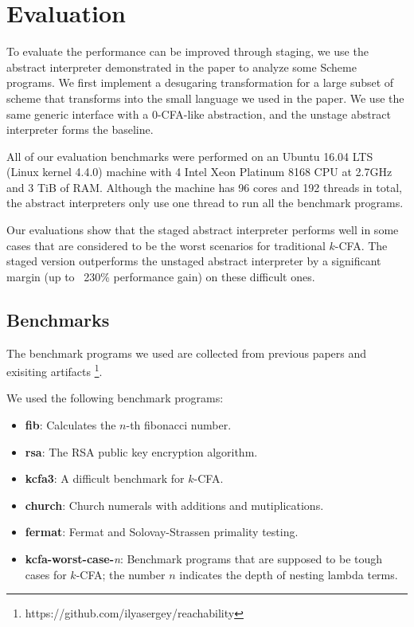 \section{Evaluation} \label{evaluation}

To evaluate the performance can be improved through staging, we use the abstract
interpreter demonstrated in the paper to analyze some Scheme programs. We first implement
a desugaring transformation for a large subset of scheme that transforms into the
small language we used in the paper.
We use the same generic interface with a 0-CFA-like abstraction, and the unstage abstract
interpreter forms the baseline.

All of our evaluation benchmarks were performed on an Ubuntu 16.04 LTS (Linux kernel 4.4.0)
machine with 4 Intel Xeon Platinum 8168 CPU at 2.7GHz and 3 TiB of RAM.
Although the machine has 96 cores and 192 threads in total,
the abstract interpreters only use one thread to run all the benchmark programs.

Our evaluations show that the staged abstract interpreter performs well in some
cases that are considered to be the worst scenarios for traditional $k$-CFA.
The staged version outperforms the unstaged abstract interpreter by a significant
margin (up to ~230\% performance gain) on these difficult ones.

\subsection{Benchmarks}
The benchmark programs we used are collected from previous papers \cite{Johnson:2013:OAA:2500365.2500604,
ashley:practical, DBLP:journals/corr/abs-1102-3676} and exisiting artifacts \footnote{https://github.com/ilyasergey/reachability}.

We used the following benchmark programs:
\begin{itemize}
    \item \textbf{fib}: Calculates the $n$-th fibonacci number.
    \item \textbf{rsa}: The RSA public key encryption algorithm.
    \item \textbf{kcfa3}: A difficult benchmark for $k$-CFA.
    \item \textbf{church}: Church numerals with additions and mutiplications.
    \item \textbf{fermat}: Fermat and Solovay-Strassen primality testing.
    \item \textbf{kcfa-worst-case-}\textit{n}: 
      Benchmark programs that are supposed to be tough cases for $k$-CFA; 
      the number $n$ indicates the depth of nesting lambda terms.
\end{itemize}

